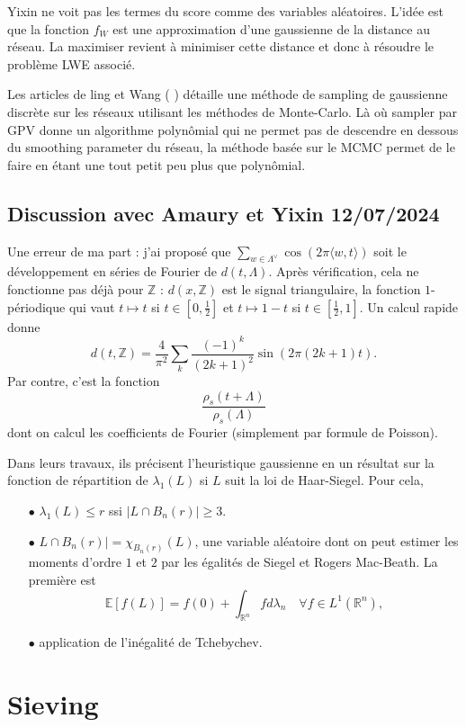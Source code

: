 \documentclass{article}
\begin{document}
Yixin ne voit pas les termes du score comme des variables aléatoires. L'idée est que la fonction $f_W$ est une approximation d'une gaussienne de la distance au réseau. La maximiser revient à minimiser cette distance et donc à résoudre le problème LWE associé.
 
Les articles de ling et Wang (\cite{wang2017geometric} \cite{wang2019lattice}) détaille une méthode de sampling de gaussienne discrète sur les réseaux utilisant les méthodes de Monte-Carlo. Là où sampler par GPV donne un algorithme polynômial qui ne permet pas de descendre en dessous du smoothing parameter du réseau, la méthode basée sur le MCMC permet de le faire en étant une tout petit peu plus que polynômial.
 
\subsection{Discussion avec Amaury et Yixin 12/07/2024}
 
Une erreur de ma part : j'ai proposé que $\sum_{w \in\Lambda^\vee} \cos (2\pi\langle w, t\rangle ) $ soit le développement en séries de Fourier de $d(t,\Lambda)$. Après vérification, cela ne fonctionne pas déjà pour $\mathbb Z$ : $d(x,\mathbb Z)$ est le signal triangulaire, la fonction $1$-périodique qui vaut $t\mapsto t$ si $t\in [0,\frac{1}{2}]$ et $t\mapsto 1-t$ si $t\in [\frac{1}{2},1]$. Un calcul rapide donne
\[d(t,\mathbb Z) = \frac{4}{\pi^2} \sum_{k }\frac{(-1)^k}{(2k+1)^2} \sin (2\pi (2k+1)t). \]
Par contre, c'est la fonction 
\[\frac{\rho_s(t+\Lambda)}{\rho_s(\Lambda)}\]
dont on calcul les coefficients de Fourier (simplement par formule de Poisson).    
 
Dans leurs travaux, ils précisent l'heuristique gaussienne en un résultat sur la fonction de répartition de $\lambda_1(L)$ si $L$ suit la loi de Haar-Siegel. Pour cela,
\begin{itemize}
\item[$\bullet$] $\lambda_1(L)\leq r$ ssi $|L\cap B_n(r)|\geq 3$.
\item[$\bullet$] $L\cap B_n(r)| = \chi_{B_n(r)}(L)$, une variable aléatoire dont on peut estimer les moments d'ordre $1$ et $2$ par les égalités de Siegel et Rogers Mac-Beath. La première est
\[\mathbb E[f(L) ] = f(0) + \int_{\mathbb R^n} fd\lambda_n\quad\forall f\in L^1(\mathbb R^n),\] 
\item[$\bullet$] application de l'inégalité de Tchebychev.
\end{itemize}  
\section{Sieving}
 
\end{document}
